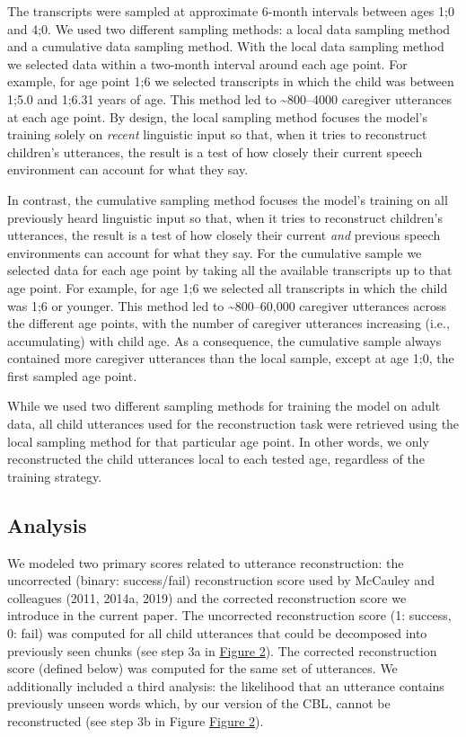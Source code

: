 \documentclass[man,mask,floatsintext]{apa6}
\begin{document}
The transcripts were sampled at approximate 6-month intervals between
ages 1;0 and 4;0. We used two different sampling methods: a local data
sampling method and a cumulative data sampling method. With the local
data sampling method we selected data within a two-month interval around
each age point. For example, for age point 1;6 we selected transcripts
in which the child was between 1;5.0 and 1;6.31 years of age. This
method led to \textasciitilde{}800--4000 caregiver utterances at each
age point. By design, the local sampling method focuses the model's
training solely on \emph{recent} linguistic input so that, when it tries
to reconstruct children's utterances, the result is a test of how
closely their current speech environment can account for what they say.

In contrast, the cumulative sampling method focuses the model's training
on all previously heard linguistic input so that, when it tries to
reconstruct children's utterances, the result is a test of how closely
their current \textit{and} previous speech environments can account for
what they say. For the cumulative sample we selected data for each age
point by taking all the available transcripts up to that age point. For
example, for age 1;6 we selected all transcripts in which the child was
1;6 or younger. This method led to \textasciitilde{}800--60,000
caregiver utterances across the different age points, with the number of
caregiver utterances increasing (i.e., accumulating) with child age. As
a consequence, the cumulative sample always contained more caregiver
utterances than the local sample, except at age 1;0, the first sampled
age point.

While we used two different sampling methods for training the model on
adult data, all child utterances used for the reconstruction task were
retrieved using the local sampling method for that particular age point.
In other words, we only reconstructed the child utterances local to each
tested age, regardless of the training strategy.

\subsection{Analysis}\label{analysis}

We modeled two primary scores related to utterance reconstruction: the
uncorrected (binary: success/fail) reconstruction score used by McCauley
and colleagues (2011, 2014a, 2019) and the corrected reconstruction
score we introduce in the current paper. The uncorrected reconstruction
score (1: success, 0: fail) was computed for all child utterances that
could be decomposed into previously seen chunks (see step 3a in
\protect\hyperlink{fig2}{Figure 2}). The corrected reconstruction score
(defined below) was computed for the same set of utterances. We
additionally included a third analysis: the likelihood that an utterance
contains previously unseen words which, by our version of the CBL,
cannot be reconstructed (see step 3b in Figure
\protect\hyperlink{fig2}{Figure 2}).
\end{document}
